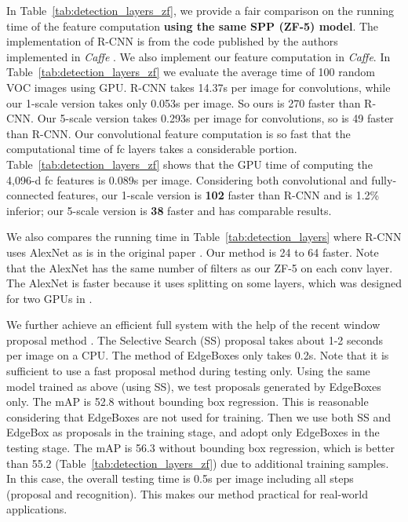 \documentclass[10pt,journal,cspaper,compsoc]{IEEEtran}
\begin{document}
In Table~\ref{tab:detection_layers_zf}, we provide a fair comparison on the running time of the feature computation \textbf{using the same SPP (ZF-5) model}.
The implementation of R-CNN is from the code published by the authors implemented in \emph{Caffe} \cite{Jia2013}. We also implement our feature computation in \emph{Caffe}. In Table~\ref{tab:detection_layers_zf} we evaluate the average time of 100 random VOC images using GPU.
R-CNN takes 14.37s per image for convolutions, while our 1-scale version takes only 0.053s per image.
So ours is 270 faster than R-CNN.
Our 5-scale version takes 0.293s per image for convolutions, so is 49 faster than R-CNN.
Our convolutional feature computation is so fast that the computational time of fc layers takes a considerable portion. Table~\ref{tab:detection_layers_zf} shows that the GPU time of computing the 4,096-d fc features is 0.089s per image. Considering both convolutional and fully-connected features, our 1-scale version is \textbf{102} faster than R-CNN and is 1.2\% inferior; our 5-scale version is \textbf{38} faster and has comparable results.

We also compares the running time in Table~\ref{tab:detection_layers} where R-CNN uses AlexNet \cite{Krizhevsky2012} as is in the original paper \cite{Girshick2014}. Our method is 24 to 64 faster. Note that the AlexNet \cite{Krizhevsky2012} has the same number of filters as our ZF-5 on each conv layer. The AlexNet is faster because it uses splitting on some layers, which was designed for two GPUs in \cite{Krizhevsky2012}.

We further achieve an efficient full system with the help of the recent window proposal method \cite{Zitnick2014}.
The Selective Search (SS) proposal \cite{Sande2011} takes about 1-2 seconds per image on a CPU. The method of EdgeBoxes \cite{Zitnick2014} only takes  0.2s. Note that it is sufficient to use a fast proposal method during testing only.
Using the same model trained as above (using SS), we test proposals generated by EdgeBoxes only. The mAP is 52.8 without bounding box regression. This is reasonable considering that EdgeBoxes are not used for training.
Then we use both SS and EdgeBox as proposals in the training stage, and adopt only EdgeBoxes in the testing stage. The mAP is 56.3 without bounding box regression, which is better than 55.2 (Table~\ref{tab:detection_layers_zf}) due to additional training samples.
In this case, the overall testing time is 0.5s per image including all steps (proposal and recognition). This makes our method practical for real-world applications.
\end{document}

